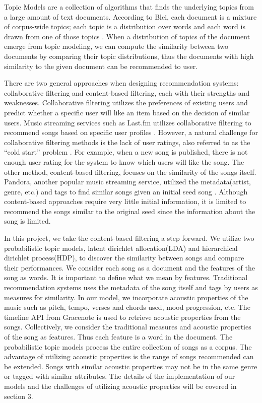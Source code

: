 \documentclass[10pt,twocolumn,letterpaper]{article}
\begin{document}
Topic Models are a collection of algorithms that finds the underlying topics from a large amount of text documents. According to Blei, each document is a mixture of corpus-wide topics; each topic is a distribution over words and each word is drawn from one of those topics \cite{slides}. When a distribution of topics of the document emerge from topic modeling, we can compute the similarity between two documents by comparing their topic distributions, thus the documents with high similarity to the given document can be recommended to user.
\par
There are two general approaches when designing recommendation systems: collaborative filtering and content-based filtering, each with their strengths and weaknesses. Collaborative filtering utilizes the preferences of existing users and predict whether a specific user will like an item based on the decision of similar users. Music streaming services such as Last.fm utilizes collaborative filtering to recommend songs based on specific user profiles \cite{collaborative}. However, a natural challenge for collaborative filtering methods is the lack of user ratings, also referred to as the “cold start” problem \cite{collaborative}. For example, when a new song is published, there is not enough user rating for the system to know which users will like the song. The other method, content-based filtering, focuses on the similarity of the songs itself. Pandora, another popular music streaming service, utilized the metadata(artist, genre, etc.) and tags to find similar songs given an initial seed song \cite{miami}. Although content-based approaches require very little initial information, it is limited to recommend the songs similar to the original seed since the information about the song is limited.
   \par
   In this project, we take the content-based filtering a step forward. We utilize two probabilistic topic models, latent dirichlet allocation(LDA) and hierarchical dirichlet process(HDP), to discover the similarity between songs and compare their performances. We consider each song as a document and the features of the song as words. It is important to define what we mean by features. Traditional recommendation systems uses the metadata of the song itself and tags by users as measures for similarity. In our model, we incorporate acoustic properties of the music such as pitch, tempo, verses and chords used, mood progression, etc. The timeline API from Gracenote is used to retrieve acoustic properties from the songs\cite{grace}. Collectively, we consider the traditional measures and acoustic properties of the song as features. Thus each feature is a word in the document. The probabilistic topic models process the entire collection of songs as a corpus. The advantage of utilizing acoustic properties is the range of songs recommended can be extended. Songs with similar acoustic properties may not be in the same genre or tagged with similar attributes. The details of the implementation of our models and the challenges of utilizing acoustic properties will be covered in section 3.
\end{document}
